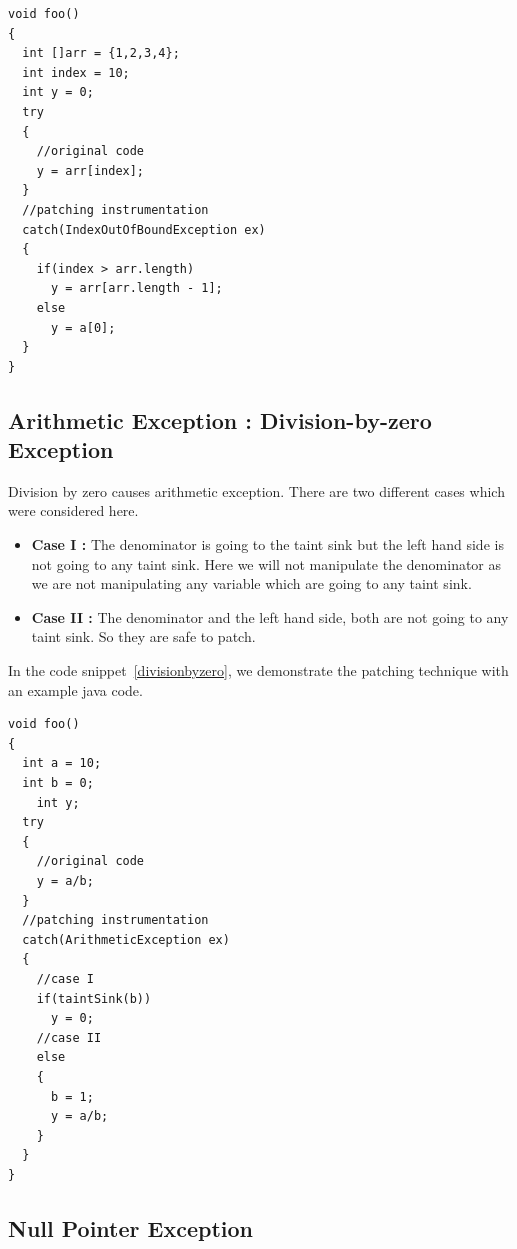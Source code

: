 \onehalfspacing
\lstset{language=Java, caption=arr index out of bound patching,
label=negativearraysize}

\begin{lstlisting}
void foo()
{
  int []arr = {1,2,3,4};
  int index = 10;
  int y = 0;
  try
  {
    //original code
    y = arr[index];
  }
  //patching instrumentation
  catch(IndexOutOfBoundException ex)
  {
    if(index > arr.length)
      y = arr[arr.length - 1];
    else
      y = a[0];
  }
}

\end{lstlisting}


\doublespacing
\subsection{Arithmetic Exception : Division-by-zero Exception}

Division by zero causes arithmetic exception. There are two different cases which were considered here. 
\begin{itemize}
 
 \item \textbf{Case I :} The denominator is going to the taint sink but the left
 hand side is not going to any taint sink.
 Here we will not manipulate the denominator as we are not manipulating any
 variable which are going to any taint sink.
 
 \item \textbf{Case II :} The denominator and the left hand side, both are not
 going to any taint sink. So they are safe to patch.

\end{itemize}

In the code snippet~\ref{divisionbyzero}, we demonstrate the patching technique
with an example java code.


\onehalfspacing
\lstset{language=Java, caption=arithmetic exception : division-by-zero patching,
label=divisionbyzero}

\begin{lstlisting}
void foo()
{
  int a = 10;
  int b = 0;
	int y;
  try
  {
    //original code
    y = a/b;
  }
  //patching instrumentation
  catch(ArithmeticException ex)
  {
    //case I
    if(taintSink(b))
      y = 0;
    //case II
    else
    {
      b = 1;
      y = a/b;
    }
  }
}
\end{lstlisting}


\doublespacing
\subsection{Null Pointer Exception}

